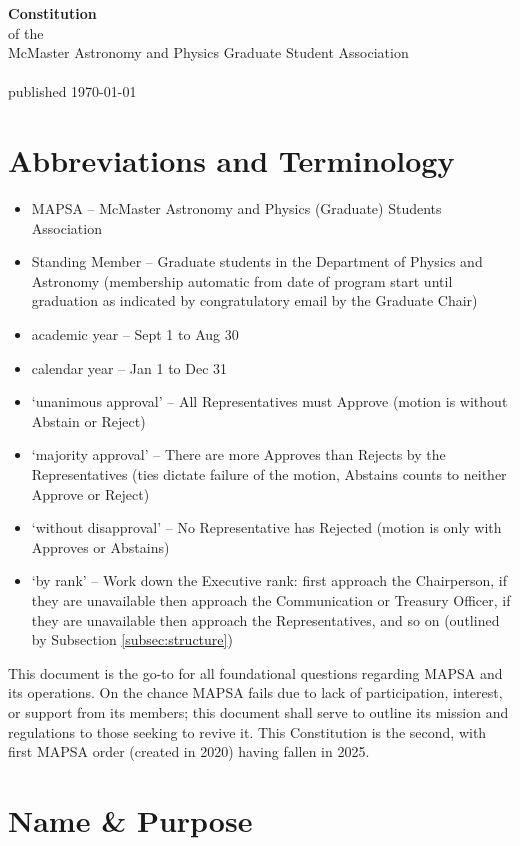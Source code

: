 \documentclass[8pt]{article}
\begin{document}
	
	\begin{center}
		\textbf{\Huge{Constitution}}\\\normalsize{of the}\\McMaster Astronomy and Physics Graduate Student Association\\~\\
		published \today
	\end{center}
	\tableofcontents	
	\section*{Abbreviations and Terminology}
	\begin{itemize}
	\item MAPSA -- McMaster Astronomy and Physics (Graduate) Students Association
	\item Standing Member -- Graduate students in the Department of Physics and Astronomy (membership automatic from date of program start until graduation as indicated by congratulatory email by the Graduate Chair) 
	\item academic year -- Sept 1 to Aug 30
	\item calendar year -- Jan 1 to Dec 31
	\item `unanimous approval' -- All Representatives must Approve (motion is without Abstain or Reject)
	\item `majority approval' -- There are more Approves than Rejects by the Representatives (ties dictate failure of the motion, Abstains counts to neither Approve or Reject)
	\item `without disapproval' -- No Representative has Rejected (motion is only with Approves or Abstains)
	\item `by rank' -- Work down the Executive rank: first approach the Chairperson, if they are unavailable then approach the Communication or Treasury Officer, if they are unavailable then approach the Representatives, and so on (outlined by Subsection \ref{subsec:structure})
\end{itemize}
	\pagebreak
	This document is the go-to for all foundational questions regarding MAPSA and its operations. On the chance MAPSA fails due to lack of participation, interest, or support from its members; this document shall serve to outline its mission and regulations to those seeking to revive it. This Constitution is the second, with first MAPSA order (created in 2020) having fallen in 2025.
	\section{Name \& Purpose}
\end{document}
